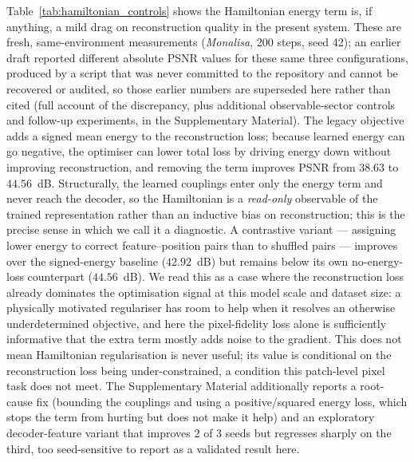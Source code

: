 \documentclass[pdflatex,sn-basic]{sn-jnl}
\begin{document}
Table~\ref{tab:hamiltonian_controls} shows the Hamiltonian energy term is, if
anything, a mild drag on reconstruction quality in the present system. These are
fresh, same-environment measurements (\textit{Monalisa}, 200 steps, seed 42); an
earlier draft reported different absolute PSNR values for these same three
configurations, produced by a script that was never committed to the repository
and cannot be recovered or audited, so those earlier numbers are superseded here
rather than cited (full account of the discrepancy, plus additional
observable-sector controls and follow-up experiments, in the Supplementary
Material). The legacy objective adds a signed mean energy to the reconstruction
loss; because learned energy can go negative, the optimiser can lower total loss
by driving energy down without improving reconstruction, and removing the term
improves PSNR from $38.63$ to $44.56$~dB. Structurally, the learned couplings
enter only the energy term and never reach the decoder, so the Hamiltonian is a
\emph{read-only} observable of the trained representation rather than an inductive
bias on reconstruction; this is the precise sense in which we call it a diagnostic.
A contrastive variant --- assigning
lower energy to correct feature--position pairs than to shuffled pairs ---
improves over the signed-energy baseline ($42.92$~dB) but remains below its own
no-energy-loss counterpart ($44.56$~dB). We read this as a case where the
reconstruction loss already dominates the optimisation signal at this model scale
and dataset size: a physically motivated regulariser has room to help when it
resolves an otherwise underdetermined objective, and here the pixel-fidelity loss
alone is sufficiently informative that the extra term mostly adds noise to the
gradient. This does not mean Hamiltonian regularisation is never useful; its
value is conditional on the reconstruction loss being under-constrained, a
condition this patch-level pixel task does not meet. The Supplementary Material
additionally reports a root-cause fix (bounding the couplings and using a
positive/squared energy loss, which stops the term from hurting but does not make
it help) and an exploratory decoder-feature variant that improves 2 of 3 seeds
but regresses sharply on the third, too seed-sensitive to report as a validated
result here.
\end{document}

